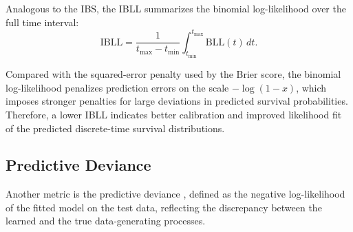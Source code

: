 \documentclass{article}
\theoremstyle{plain}
\theoremstyle{definition}
\theoremstyle{remark}
\begin{document}
Analogous to the IBS, the IBLL summarizes the binomial log-likelihood over the full time interval:
\begin{equation}
\label{eq:IBLL}
\mathrm{IBLL}
= \frac{1}{t_{\max} - t_{\min}}
\int_{t_{\min}}^{t_{\max}} \mathrm{BLL}(t)\, dt.
\end{equation}

Compared with the squared-error penalty used by the Brier score, the binomial log-likelihood penalizes prediction errors on the scale $-\log(1-x)$, which imposes stronger penalties for large deviations in predicted survival probabilities.  
Therefore, a lower IBLL indicates better calibration and improved likelihood fit of the predicted discrete-time survival distributions.

\subsection{Predictive Deviance}
Another metric is the predictive deviance \citep{burnham1998practical, tutz2016modeling}, defined as the negative log-likelihood of the fitted model on the test data, reflecting the discrepancy between the learned and the true data-generating processes.
\end{document}
